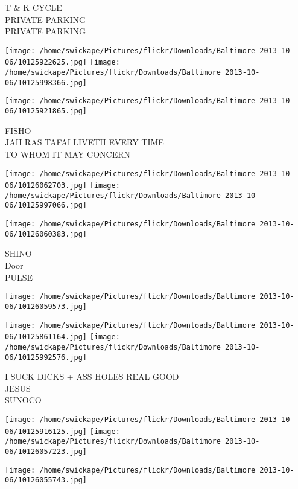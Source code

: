 \documentclass[10pt,letterpaper]{article}
\begin{document}
T \& K CYCLE\\
PRIVATE PARKING\\
PRIVATE PARKING\\
\pagebreak

\texttt{[image: /home/swickape/Pictures/flickr/Downloads/Baltimore 2013-10-06/10125922625.jpg]}
\texttt{[image: /home/swickape/Pictures/flickr/Downloads/Baltimore 2013-10-06/10125998366.jpg]}

\vspace{0.25in}
\texttt{[image: /home/swickape/Pictures/flickr/Downloads/Baltimore 2013-10-06/10125921865.jpg]}

FISHO\\
JAH RAS TAFAI LIVETH EVERY TIME\\
TO WHOM IT MAY CONCERN\\
\pagebreak

\texttt{[image: /home/swickape/Pictures/flickr/Downloads/Baltimore 2013-10-06/10126062703.jpg]}
\texttt{[image: /home/swickape/Pictures/flickr/Downloads/Baltimore 2013-10-06/10125997066.jpg]}

\vspace{0.25in}
\texttt{[image: /home/swickape/Pictures/flickr/Downloads/Baltimore 2013-10-06/10126060383.jpg]}

SHINO\\
Door\\
PULSE\\
\pagebreak

\texttt{[image: /home/swickape/Pictures/flickr/Downloads/Baltimore 2013-10-06/10126059573.jpg]}

\vspace{0.25in}
\texttt{[image: /home/swickape/Pictures/flickr/Downloads/Baltimore 2013-10-06/10125861164.jpg]}
\texttt{[image: /home/swickape/Pictures/flickr/Downloads/Baltimore 2013-10-06/10125992576.jpg]}

I SUCK DICKS + ASS HOLES REAL GOOD\\
JESUS\\
SUNOCO\\
\pagebreak

\texttt{[image: /home/swickape/Pictures/flickr/Downloads/Baltimore 2013-10-06/10125916125.jpg]}
\texttt{[image: /home/swickape/Pictures/flickr/Downloads/Baltimore 2013-10-06/10126057223.jpg]}

\vspace{0.25in}
\texttt{[image: /home/swickape/Pictures/flickr/Downloads/Baltimore 2013-10-06/10126055743.jpg]}
\end{document}
